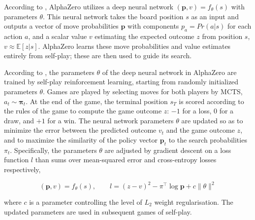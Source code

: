 

According to \cite{silver2017masteringchessshogiselfplay}, AlphaZero utilizes a deep neural network $(\mathbf{p}, v) = f_\theta(s)$ with parameters $\theta$. This neural network takes the board position $s$ as an input and outputs a vector of move probabilities $\mathbf{p}$ with components $p_a = Pr(a|s)$ for each action $a$, and a scalar value $v$ estimating the expected outcome $z$ from position $s$, $v \approx \mathbb{E}[z|s]$. AlphaZero learns these move probabilities and value estimates entirely from self-play; these are then used to guide its search.

According to \cite{silver2017masteringchessshogiselfplay}, the parameters $\theta$ of the deep neural network in AlphaZero are trained by self-play reinforcement learning, starting from randomly initialized parameters $\theta$. Games are played by selecting moves for both players by MCTS, $a_t \sim \mathbf{\pi}_t$. At the end of the game, the terminal position $s_T$ is scored according to the rules of the game to compute the game outcome $z$: $-1$ for a loss, $0$ for a draw, and $+1$ for a win. The neural network parameters $\theta$ are updated so as to minimize the error between the predicted outcome $v_t$ and the game outcome $z$, and to maximize the similarity of the policy vector $\mathbf{p}_t$ to the search probabilities $\pi_t$. Specifically, the parameters $\theta$ are adjusted by gradient descent on a loss function $l$ than sums over mean-squared error and cross-entropy losses respectively,

\begin{equation}\label{eq:loss}
    (\mathbf{p}, v) = f_\theta(s), \qquad l = (z - v)^2 - \pi^\top \log \mathbf{p} + c\lVert\theta\rVert^2
\end{equation}

where $c$ is a parameter controlling the level of $L_2$ weight regularisation. The updated parameters are used in subsequent games of self-play.

